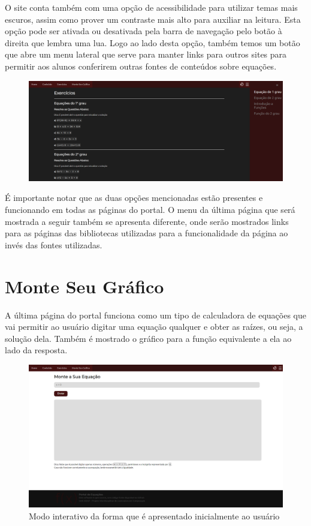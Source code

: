 \documentclass[12pt]{report}
\begin{document}
O site conta também com uma opção de acessibilidade para utilizar temas mais escuros, assim como prover um contraste mais alto para auxiliar na leitura. Esta opção pode ser ativada ou desativada pela barra de navegação pelo botão à direita que lembra uma lua. Logo ao lado desta opção, também temos um botão que abre um menu lateral que serve para manter links para outros sites para permitir aos alunos conferirem outras fontes de conteúdos sobre equações.

\begin{figure}[H]
    \includegraphics[width=1\textwidth]{img/aplicacao/menu_links.png}
\end{figure}

É importante notar que as duas opções mencionadas estão presentes e funcionando em todas as páginas do portal. O menu da última página que será mostrada a seguir também se apresenta diferente, onde serão mostrados links para as páginas das bibliotecas utilizadas para a funcionalidade da página ao invés das fontes utilizadas.

\section{Monte Seu Gráfico}
A última página do portal funciona como um tipo de calculadora de equações que vai permitir ao usuário digitar uma equação qualquer e obter as raízes, ou seja, a solução dela. Também é mostrado o gráfico para a função equivalente a ela ao lado da resposta.

\begin{figure}[H]
    \includegraphics[width=1\textwidth]{img/aplicacao/interativo.png}
    \caption{Modo interativo da forma que é apresentado inicialmente ao usuário}
\end{figure}
\end{document}
